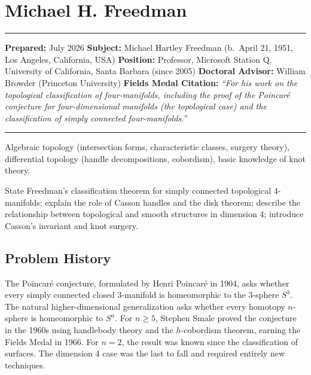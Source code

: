 \chapter{Michael H. Freedman}\label{ch1986michaelfreedman:michael-h.-freedman-fields-medal-1986-a-comprehensive-report}

\begin{center}\rule{0.5\linewidth}{0.5pt}\end{center}

\textbf{Prepared:} July 2026 \textbf{Subject:} Michael Hartley Freedman (b.~April 21, 1951, Los Angeles, California, USA) \textbf{Position:} Professor, Microsoft Station Q, University of California, Santa Barbara (since 2005) \textbf{Doctoral Advisor:} William Browder (Princeton University) \textbf{Fields Medal Citation:} \emph{``For his work on the topological classification of four-manifolds, including the proof of the Poincar\'e conjecture for four-dimensional manifolds (the topological case) and the classification of simply connected four-manifolds.''}

\begin{center}\rule{0.5\linewidth}{0.5pt}\end{center}

\begin{prereqs} Algebraic topology (intersection forms, characteristic classes, surgery theory), differential topology (handle decompositions, cobordism), basic knowledge of knot theory. \end{prereqs}

\begin{objectives} State Freedman's classification theorem for simply connected topological 4-manifolds; explain the role of Casson handles and the disk theorem; describe the relationship between topological and smooth structures in dimension 4; introduce Casson's invariant and knot surgery. \end{objectives}

\section{Problem History}

The Poincar\'e conjecture, formulated by Henri Poincar\'e in 1904, asks whether every simply connected closed 3-manifold is homeomorphic to the 3-sphere $S^3$. The natural higher-dimensional generalization asks whether every homotopy $n$-sphere is homeomorphic to $S^n$. For $n \geq 5$, Stephen Smale proved the conjecture in the 1960s using handlebody theory and the $h$-cobordism theorem, earning the Fields Medal in 1966. For $n = 2$, the result was known since the classification of surfaces. The dimension 4 case was the last to fall and required entirely new techniques.

